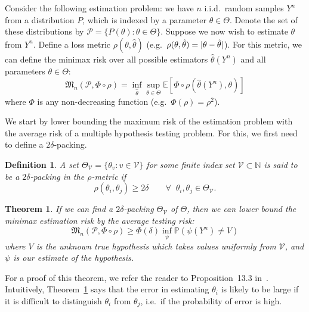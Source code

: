 \documentclass[conference]{IEEEtran}
\DeclarePairedDelimiter\abs{\lvert}{\rvert}
\newcommand{\Phiorho}{\Phi\!\circ\!\rho}
\newtheorem{theorem}{Theorem}
\newtheorem{definition}{Definition}
\begin{document}
Consider the following estimation problem: we have $n$ i.i.d.\ random samples
$Y^n$ from a distribution $P$, which is indexed by a parameter $\theta \in
\Theta$.  Denote the set of these distributions by $\mathcal{P} = \{P(\theta) :
\theta \in \Theta\}$. Suppose we now wish to estimate $\theta$ from $Y^n$.
Define a loss metric $\rho(\theta, \hat\theta)$ (e.g.\ $\rho(\theta,
\hat\theta) = \abs{\theta - \hat\theta}$). For this metric, we can define the
minimax risk over all possible estimators $\hat\theta(Y^n)$ and all parameters
$\theta \in \Theta$:
\begin{equation} \label{eq:minimax-expr}
	\mathfrak{M}_n(\mathcal{P}, \Phiorho) = \inf_{\hat\theta} \sup_{\theta \in \Theta} \mathbb E[\Phiorho (\hat\theta(Y^n), \theta)]
\end{equation}
where $\Phi$ is any non-decreasing function (e.g.\ $\Phi(\rho) = \rho^2$).

We start by lower bounding the maximum risk of the estimation problem with the
average risk of a multiple hypothesis testing problem. For this, we first need
to define a $2\delta$-packing.%
\begin{definition}
	A set $\Theta_{\mathcal{V}} = \{ \theta_v : v \in \mathcal{V} \}$ for some
	finite index set $\mathcal{V} \subset \mathbb N$ is said to be a
	$2\delta$-packing in the $\rho$-metric if
	\begin{equation}
		\rho(\theta_i, \theta_j) \geq 2\delta \qquad \forall \;\; \theta_i, \theta_j \in \Theta_{\mathcal{V}}.
	\end{equation}
\end{definition}
\begin{theorem} \label{thm:est-to-testing}%
	If we can find a $2\delta$-packing $\Theta_{\mathcal{V}}$ of $\Theta$, then
	we can lower bound the minimax estimation risk by the average testing risk:
	\begin{equation}
		\mathfrak{M}_n(\mathcal{P}, \Phiorho) \geq \Phi(\delta) \inf_\psi \mathbb P (\psi(Y^n) \neq V)
	\end{equation}
	where $V$ is the unknown true hypothesis which takes values uniformly from
	$\mathcal{V}$, and $\psi$ is our estimate of the hypothesis.
\end{theorem}
For a proof of this theorem, we refer the reader to Proposition~13.3
in~\cite{Duchi2015Information}. Intuitively, Theorem~\ref{thm:est-to-testing}
says that the error in estimating $\theta_i$ is likely to be large if it is
difficult to distinguish $\theta_i$ from $\theta_j$, i.e.\ if the probability
of error is high.
\end{document}
